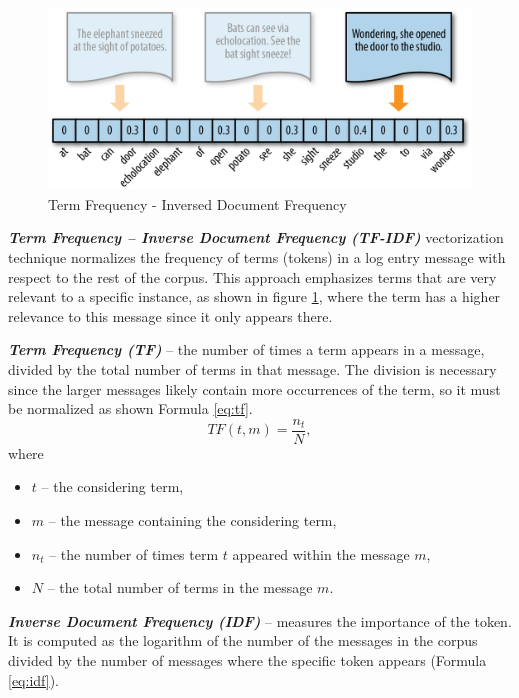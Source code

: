 \documentclass[thesis=M,english]{FITthesis}[2019/12/23]
\begin{document}
\begin{figure}[h!]\centering
	\includegraphics[scale=0.8]{tf-idf}
	\caption{Term Frequency - Inversed Document Frequency}\label{fig:tf-idf}
\end{figure}

\textit{\textbf{Term Frequency – Inverse Document Frequency (TF-IDF)}} vectorization technique normalizes the frequency of terms (tokens) in a log entry message with respect to the rest of the corpus. This approach emphasizes terms that are very relevant to a specific instance, as shown in figure \ref{fig:tf-idf}, where the term has a higher relevance to this message since it only appears there\cite{vectorization}. 

\textit{\textbf{Term Frequency (TF)}} -- the number of times a term appears in a message, divided by the total number of terms in that message. The division is necessary since the larger messages likely contain more occurrences of the term, so it must be normalized as shown Formula \ref{eq:tf}.
\begin{equation}\label{eq:tf}
	TF(t, m) = \frac{n_t}{N},
\end{equation}
where
\begin{itemize}
	\item \(t\) -- the considering term,
	\item \(m\) -- the message containing the considering term,
	\item \(n_t\) -- the number of times term \(t\) appeared within the message \(m\),
	\item \(N\) -- the total number of terms in the message \(m\).
\end{itemize}

\textit{\textbf{Inverse Document Frequency (IDF)}} -- measures the importance of the token. It is computed as the logarithm of the number of the messages in the corpus divided by the number of messages where the specific token appears (Formula \ref{eq:idf}).
\end{document}
